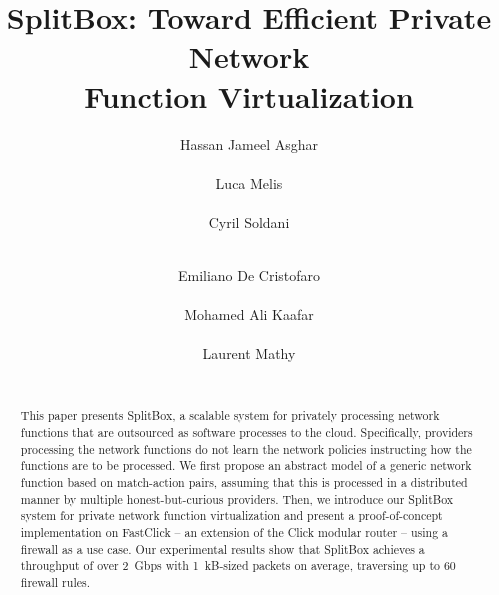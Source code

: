 \RequirePackage{fix-cm} \let\oldvec\vec \documentclass{sig-alternate-05-2015}
\newif\ifshort
\begin{document}
 


\ifshort
\else
\makeatletter
\def\@copyrightspace{\relax}
\makeatother
\fi


\sloppy

\title{SplitBox: Toward Efficient Private Network\\Function Virtualization\ifshort\else{}\fi}



\author{
\alignauthor
Hassan Jameel Asghar\\
		\\
\alignauthor
Luca Melis\\
		\\
\alignauthor
Cyril Soldani\\
		\\
\and
\alignauthor
Emiliano De Cristofaro\\
		\\
\alignauthor
Mohamed Ali Kaafar\\
		\\
\alignauthor
Laurent Mathy\\
		\\
}

\maketitle
\begin{abstract}
This paper presents SplitBox, a scalable system for privately processing network functions that are outsourced as software processes to the cloud. Specifically, providers processing the network functions do not learn the network policies instructing how the functions are to be processed. We first propose an abstract model of a generic network function based on match-action pairs, assuming that this is processed in a distributed manner by multiple honest-but-curious providers. Then, we introduce our SplitBox system for private network function virtualization and present a proof-of-concept implementation on FastClick -- an extension of the Click modular router -- using a firewall as a use case. Our experimental results show that SplitBox achieves a throughput of over 2~Gbps with 1~kB-sized packets on average, traversing up to 60 firewall rules.
\end{abstract}
\end{document}
